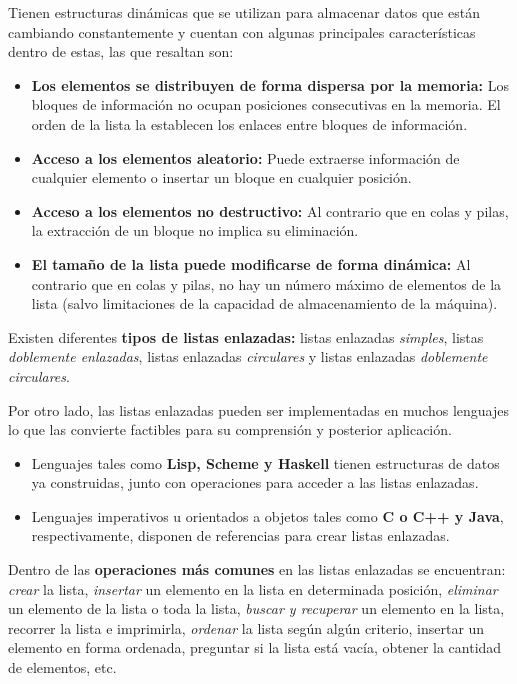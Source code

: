 \documentclass[10pt,journal]{IEEEtran}
\begin{document}
    Tienen estructuras dinámicas que se utilizan para almacenar datos que están cambiando constantemente y cuentan con algunas principales características \cite{george1999introduccion} dentro de estas, las que resaltan son:
    \begin{itemize}
    \item \textbf{Los elementos se distribuyen de forma dispersa por la memoria:}
    Los bloques de información no ocupan posiciones consecutivas en la memoria. El orden de la lista la establecen los enlaces entre bloques de información.
    \item \textbf{Acceso a los elementos aleatorio:}
    Puede extraerse información de cualquier elemento o insertar un bloque en cualquier posición.
    \item \textbf{Acceso a los elementos no destructivo:}
    Al contrario que en colas y pilas, la extracción de un bloque no implica su eliminación.
    \item \textbf{El tamaño de la lista puede modificarse de forma dinámica:}
    Al contrario que en colas y pilas, no hay un número máximo de elementos de la lista (salvo limitaciones de la capacidad de almacenamiento de la máquina).
    \end{itemize}
    
    Existen diferentes \textbf{tipos de listas enlazadas:} listas enlazadas \textit{simples}, listas \textit{doblemente enlazadas}, listas enlazadas \textit{circulares} y listas enlazadas \textit{doblemente circulares}.
    
    Por otro lado, las listas enlazadas pueden ser implementadas en muchos lenguajes lo que las convierte factibles para su comprensión y posterior aplicación.
    \begin{itemize}
        \item Lenguajes tales como \textbf{Lisp, Scheme y Haskell} tienen estructuras de datos ya construidas, junto con operaciones para acceder a las listas enlazadas.
        \item Lenguajes imperativos u orientados a objetos tales como \textbf{C o C++ y Java}, respectivamente, disponen de referencias para crear listas enlazadas.
    \end{itemize}
    
    Dentro de las \textbf{operaciones más comunes} en las listas enlazadas se encuentran: \textit{crear} la lista, \textit{insertar} un elemento en la lista en determinada posición, \textit{eliminar} un elemento de la lista o toda la lista, \textit{buscar y recuperar} un elemento en la lista, recorrer la lista e imprimirla, \textit{ordenar} la lista según algún criterio, insertar un elemento en forma ordenada, preguntar si la lista está vacía, obtener la cantidad de elementos, etc.
    
\end{document}
